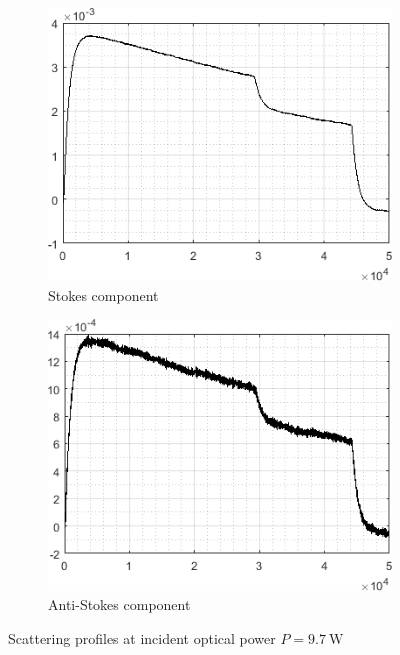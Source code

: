 \documentclass{standalone}
\begin{document}
\begin{figure}[b!]
	\centering
	\begin{subfigure}[b]{0.49\textwidth}
		\includegraphics[width=\textwidth]{mmf_scatters_stokes.png}
		\caption{Stokes component}
	\end{subfigure}
	\begin{subfigure}[b]{0.49\textwidth}
		\includegraphics[width=\textwidth]{mmf_scatters_antistokes.png}
		\caption{Anti-Stokes component}
	\end{subfigure}
	\caption{Scattering profiles at incident optical power $P = \SI{9.7}{\watt}$}
	\label{fig:mmf_scatters}
\end{figure}
\end{document}
